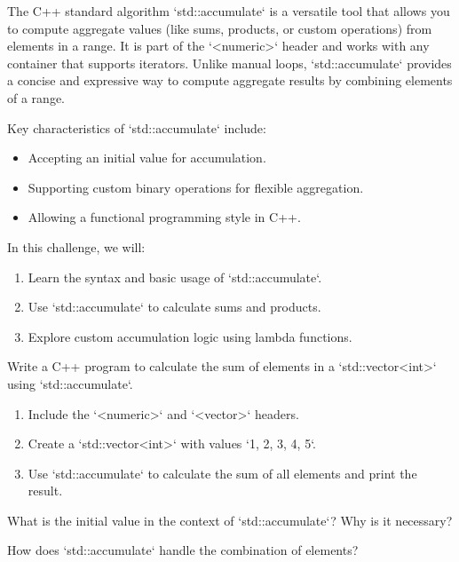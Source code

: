 \begin{challenge}
    \begin{chadescription}
    The C++ standard algorithm `std::accumulate` is a versatile tool that allows you to compute aggregate values (like sums, products, or custom operations) from elements in a range.
    It is part of the `<numeric>` header and works with any container that supports iterators.
    Unlike manual loops, `std::accumulate` provides a concise and expressive way to compute aggregate results by combining elements of a range.
    
    Key characteristics of `std::accumulate` include:
    \begin{itemize}
        \item Accepting an initial value for accumulation.
        \item Supporting custom binary operations for flexible aggregation.
        \item Allowing a functional programming style in C++.
    \end{itemize}

    In this challenge, we will:
    \begin{enumerate}
        \item Learn the syntax and basic usage of `std::accumulate`.
        \item Use `std::accumulate` to calculate sums and products.
        \item Explore custom accumulation logic using lambda functions.
    \end{enumerate}
    \end{chadescription}

    \begin{task}
    Write a C++ program to calculate the sum of elements in a `std::vector<int>` using `std::accumulate`.
    \begin{enumerate}
        \item Include the `<numeric>` and `<vector>` headers.
        \item Create a `std::vector<int>` with values `{1, 2, 3, 4, 5}`.
        \item Use `std::accumulate` to calculate the sum of all elements and print the result.
    \end{enumerate}
    \begin{questions}
        \item What is the initial value in the context of `std::accumulate`? Why is it necessary?
        \item How does `std::accumulate` handle the combination of elements?
    \end{questions}
    \end{task}


\end{challenge}
